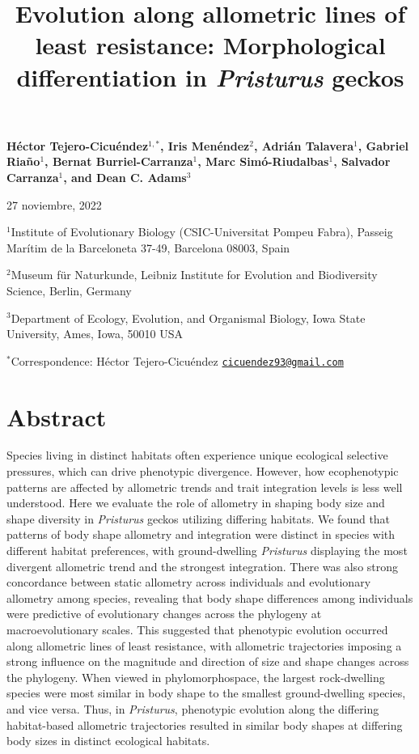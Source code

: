 \documentclass[
  11pt,
]{article}
\title{Evolution along allometric lines of least resistance: Morphological
differentiation in \emph{Pristurus} geckos}
\author{}
\date{\vspace{-2.5em}}
\begin{document}
\maketitle

\begin{center}
\textbf{H{\'{e}}ctor Tejero-Cicu{\'{e}}ndez$^{1,*}$,  Iris Men{\'{e}}ndez$^{2}$, Adri{\'{a}}n Talavera$^{1}$, Gabriel Riaño$^{1}$, Bernat Burriel-Carranza$^{1}$, Marc Sim{\'{o}}-Riudalbas$^{1}$, Salvador Carranza$^{1}$, and Dean C. Adams$^{3}$}
\end{center}

\begin{center}27 noviembre, 2022\end{center}

\(^{1}\)Institute of Evolutionary Biology (CSIC-Universitat Pompeu
Fabra), Passeig Marítim de la Barceloneta 37-49, Barcelona 08003, Spain

\(^{2}\)Museum für Naturkunde, Leibniz Institute for Evolution and
Biodiversity Science, Berlin, Germany

\(^{3}\)Department of Ecology, Evolution, and Organismal Biology, Iowa
State University, Ames, Iowa, 50010 USA

\(^{*}\)Correspondence: Héctor Tejero-Cicuéndez
\href{mailto:cicuendez93@gmail.com}{\nolinkurl{cicuendez93@gmail.com}}

\newpage

\hypertarget{abstract}{%
\section{Abstract}\label{abstract}}

Species living in distinct habitats often experience unique ecological
selective pressures, which can drive phenotypic divergence. However, how
ecophenotypic patterns are affected by allometric trends and trait
integration levels is less well understood. Here we evaluate the role of
allometry in shaping body size and shape diversity in \emph{Pristurus}
geckos utilizing differing habitats. We found that patterns of body
shape allometry and integration were distinct in species with different
habitat preferences, with ground-dwelling \emph{Pristurus} displaying
the most divergent allometric trend and the strongest integration. There
was also strong concordance between static allometry across individuals
and evolutionary allometry among species, revealing that body shape
differences among individuals were predictive of evolutionary changes
across the phylogeny at macroevolutionary scales. This suggested that
phenotypic evolution occurred along allometric lines of least
resistance, with allometric trajectories imposing a strong influence on
the magnitude and direction of size and shape changes across the
phylogeny. When viewed in phylomorphospace, the largest rock-dwelling
species were most similar in body shape to the smallest ground-dwelling
species, and vice versa. Thus, in \emph{Pristurus}, phenotypic evolution
along the differing habitat-based allometric trajectories resulted in
similar body shapes at differing body sizes in distinct ecological
habitats.
\end{document}
